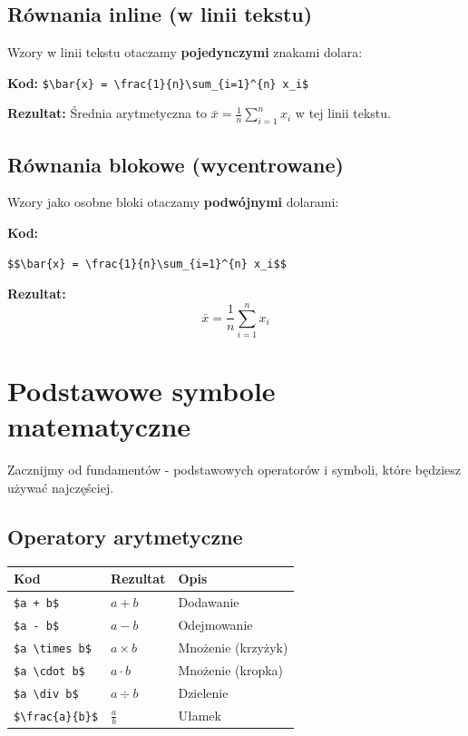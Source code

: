 \documentclass[
  polish,
  letterpaper,
  DIV=11,
  numbers=noendperiod]{scrreprt}
\newcounter{none} %
\begin{document}
\subsection{Równania inline (w linii
tekstu)}\label{ruxf3wnania-inline-w-linii-tekstu}

Wzory w linii tekstu otaczamy \textbf{pojedynczymi} znakami dolara:

\textbf{Kod:}
\texttt{\$\textbackslash{}bar\{x\}\ =\ \textbackslash{}frac\{1\}\{n\}\textbackslash{}sum\_\{i=1\}\^{}\{n\}\ x\_i\$}

\textbf{Rezultat:} Średnia arytmetyczna to
\(\bar{x} = \frac{1}{n}\sum_{i=1}^{n} x_i\) w tej linii tekstu.

\subsection{Równania blokowe
(wycentrowane)}\label{ruxf3wnania-blokowe-wycentrowane}

Wzory jako osobne bloki otaczamy \textbf{podwójnymi} dolarami:

\textbf{Kod:}

\begin{verbatim}
$$\bar{x} = \frac{1}{n}\sum_{i=1}^{n} x_i$$
\end{verbatim}

\textbf{Rezultat:} \[\bar{x} = \frac{1}{n}\sum_{i=1}^{n} x_i\]

\section{Podstawowe symbole
matematyczne}\label{podstawowe-symbole-matematyczne}

Zacznijmy od fundamentów - podstawowych operatorów i symboli, które
będziesz używać najczęściej.

\subsection{Operatory arytmetyczne}\label{operatory-arytmetyczne}

{\def\LTcaptype{none} %
\begin{longtable}[]{@{}lll@{}}
\toprule\noalign{}
Kod & Rezultat & Opis \\
\midrule\noalign{}
\endhead
\bottomrule\noalign{}
\endlastfoot
\texttt{\$a\ +\ b\$} & \(a + b\) & Dodawanie \\
\texttt{\$a\ -\ b\$} & \(a - b\) & Odejmowanie \\
\texttt{\$a\ \textbackslash{}times\ b\$} & \(a \times b\) & Mnożenie
(krzyżyk) \\
\texttt{\$a\ \textbackslash{}cdot\ b\$} & \(a \cdot b\) & Mnożenie
(kropka) \\
\texttt{\$a\ \textbackslash{}div\ b\$} & \(a \div b\) & Dzielenie \\
\texttt{\$\textbackslash{}frac\{a\}\{b\}\$} & \(\frac{a}{b}\) &
Ułamek \\
\end{longtable}
}
\end{document}
